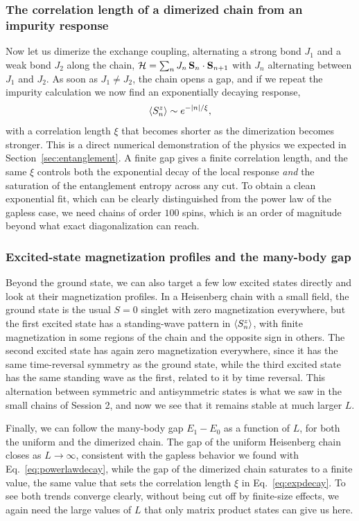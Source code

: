 \documentclass[lecture_notes.tex]{subfiles}
\begin{document}
\subsubsection{The correlation length of a dimerized chain from an impurity response}
Now let us dimerize the exchange coupling, alternating a strong bond $J_1$ and a weak bond $J_2$
along the chain, $\mathcal{H} = \sum_n J_n\,\vb S_n\cdot\vb S_{n+1}$ with $J_n$ alternating between $J_1$
and $J_2$. As soon as $J_1\ne J_2$, the chain opens a gap, and if we repeat the impurity
calculation we now find an exponentially decaying response,
\begin{equation}
  \expval{S_n^z} \sim e^{-|n|/\xi},
  \label{eq:expdecay}
\end{equation}
with a correlation length $\xi$ that becomes shorter as the dimerization becomes stronger. This is
a direct numerical demonstration of the physics we expected in Section~\ref{sec:entanglement}. A
finite gap gives a finite correlation length, and the same $\xi$ controls both the exponential
decay of the local response \emph{and} the saturation of the entanglement entropy across any cut.
To obtain a clean exponential fit, which can be clearly distinguished from the power law of the
gapless case, we need chains of order $100$ spins, which is an order of magnitude beyond what
exact diagonalization can reach.

\subsubsection{Excited-state magnetization profiles and the many-body gap}
Beyond the ground state, we can also target a few low excited states directly and look at their
magnetization profiles. In a Heisenberg chain with a small field, the ground state is the usual
$S=0$ singlet with zero magnetization everywhere, but the first excited state has a standing-wave
pattern in $\expval{S_n^z}$, with finite magnetization in some regions of the chain and the
opposite sign in others. The second excited state has again zero magnetization everywhere, since
it has the same time-reversal symmetry as the ground state, while the third excited state has the
same standing wave as the first, related to it by time reversal. This alternation between
symmetric and antisymmetric states is what we saw in the small chains of Session 2, and now we see
that it remains stable at much larger $L$.

Finally, we can follow the many-body gap $E_1 - E_0$ as a function of $L$, for both the uniform and
the dimerized chain. The gap of the uniform Heisenberg chain closes as $L\to\infty$, consistent
with the gapless behavior we found with Eq.~\eqref{eq:powerlawdecay}, while the gap of the
dimerized chain saturates to a finite value, the same value that sets the correlation length $\xi$
in Eq.~\eqref{eq:expdecay}. To see both trends converge clearly, without being cut off by
finite-size effects, we again need the large values of $L$ that only matrix product states can
give us here.
\end{document}
